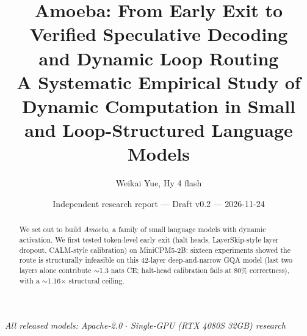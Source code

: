 \documentclass[11pt,a4paper]{article}
\title{\textbf{Amoeba: From Early Exit to Verified Speculative Decoding\\
\large and Dynamic Loop Routing}\\
{\large A Systematic Empirical Study of Dynamic Computation in Small and Loop-Structured Language Models}}
\author{Weikai Yue, Hy 4 flash}
\date{Independent research report --- Draft v0.2 --- 2026-11-24}
\begin{document}
\maketitle

\begin{center}
\textit{All released models: Apache-2.0 \quad $\cdot$ \quad Single-GPU (RTX 4080S 32GB) research}
\end{center}

\begin{abstract}
We set out to build \emph{Amoeba}, a family of small language models with dynamic activation.
We first tested token-level early exit (halt heads, LayerSkip-style layer dropout, CALM-style
calibration) on MiniCPM5-2B: sixteen experiments showed the route is structurally infeasible on
this 42-layer deep-and-narrow GQA model (last two layers alone contribute $\sim$1.3 nats CE;
halt-head calibration fails at 80\% correctness), with a $\sim$1.16$\times$ structural ceiling.


\end{abstract}
\end{document}

